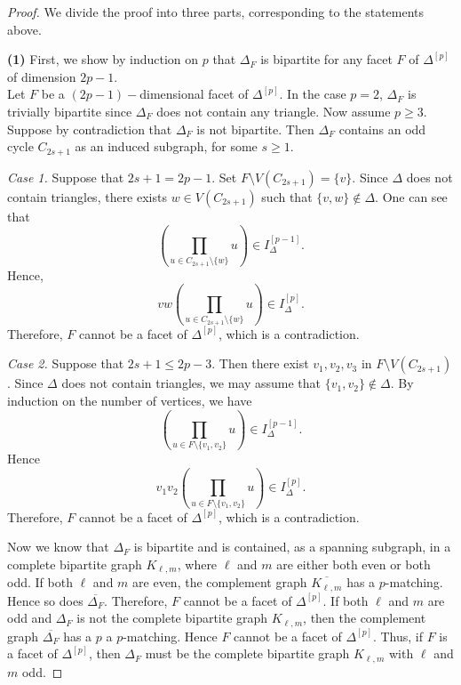 \documentclass[10pt,a4paper]{amsart}
\begin{document}
\begin{proof}

We divide the proof into three parts, corresponding to the statements above.

\textbf{(1)} First, we show by induction on $p$ that $\Delta_F$ is bipartite for any facet $F$ of $\Delta^{[p]}$ of dimension $2p-1$. \\
Let $F$ be a $(2p-1)-$dimensional facet of $\Delta^{[p]}$. %
In the case $p=2$, $\Delta_F$ is trivially bipartite since $\Delta_F$ does not contain any triangle. Now assume $p \ge 3$. Suppose by contradiction that $\Delta_F$ is not bipartite. Then $\Delta_F$ contains an odd cycle $C_{2s+1}$ as an induced subgraph, for some $s\geq 1$.

\textit{Case 1.} Suppose that $2s+1 = 2p-1$.
Set $F \setminus V(C_{2s+1}) = \{v\}$.
Since $\Delta$ does not contain triangles, there exists $w \in V(C_{2s+1})$ such that $\{v,w\} \notin \Delta$.
One can see that
$$
\left( \prod_{u \in C_{2s+1} \setminus \{w\}} u \right)\in I_{\Delta}^{[p-1]}.
$$
Hence,
$$
vw \left( \prod_{u \in C_{2s+1} \setminus \{w\}} u \right)\in I_{\Delta}^{[p]}.
$$
Therefore, $F$ cannot be a facet of $\Delta^{[p]}$, which is a contradiction.

\textit{Case 2.} Suppose that $2s+1 \le 2p-3$.
Then there exist $v_1, v_2, v_3$ in $F \setminus V(C_{2s+1})$.
Since $\Delta$ does not contain triangles, we may assume that $\{v_1,v_2\} \notin \Delta$.
By induction on the number of vertices, we have
$$
\left(\prod_{u \in F \setminus \{v_1, v_2\}} u\right) \in I_{\Delta}^{[p-1]}.
$$
Hence
$$
v_1 v_2 \left(\prod_{u \in F \setminus \{v_1, v_2\}} u\right) \in I_{\Delta}^{[p]}.
$$
Therefore, $F$ cannot be a facet of $\Delta^{[p]}$, which is a contradiction.

Now we know that $\Delta_F$ is bipartite and is contained, as a spanning subgraph, in a complete bipartite graph $K_{\ell,m}$, where $\ell$ and $m$ are either both even or both odd.
If both $\ell$ and $m$ are even, the complement graph $\overline{K_{\ell,m}}$ has a $p$-matching. Hence so does $\overline{\Delta_F}$. Therefore, $F$ cannot be a facet of $\Delta^{[p]}$.
If both $\ell$ and $m$ are odd and $\Delta_F$ is not the complete bipartite graph $K_{\ell,m}$, then the complement graph $\overline{\Delta_F}$ has a $p$ a $p$-matching. Hence $F$ cannot be a facet of $\Delta^{[p]}$.
Thus, if $F$ is a facet of $\Delta^{[p]}$, then $\Delta_F$ must be the complete bipartite graph $K_{\ell,m}$ with $\ell$ and $m$ odd.


\end{proof}
\end{document}
